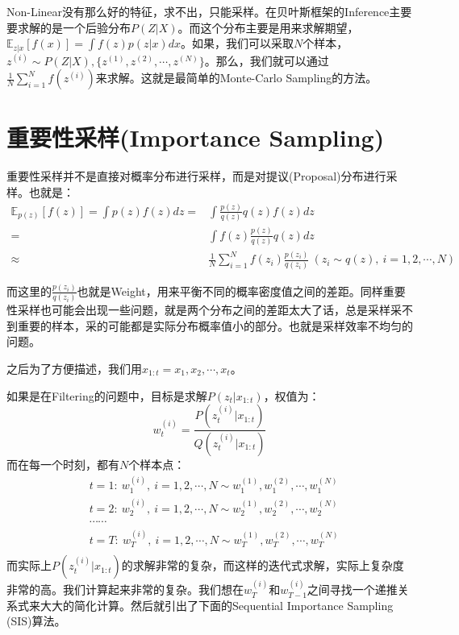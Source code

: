 \documentclass[a4paper]{article}
\begin{document}
Non-Linear没有那么好的特征，求不出，只能采样。在贝叶斯框架的Inference主要要求解的是一个后验分布$P(Z|X)$。而这个分布主要是用来求解期望，$\mathbb{E}_{z|x}[f(x)] = \int f(z)p(z|x)dx$。如果，我们可以采取$N$个样本，$z^{(i)}\sim P(Z|X),\{ z^{(1)},z^{(2)},\cdots,z^{(N)} \}$。那么，我们就可以通过$\frac{1}{N}\sum_{i=1}^N f(z^{(i)})$来求解。这就是最简单的Monte-Carlo Sampling的方法。

\section{重要性采样(Importance Sampling)}
重要性采样并不是直接对概率分布进行采样，而是对提议(Proposal)分布进行采样。也就是：
\begin{equation}
    \begin{split}
        \mathbb{E}_{p(z)}[f(z)] = \int p(z)f(z)dz 
        = & \int \frac{p(z)}{q(z)} q(z)f(z)dz \\
        = & \int f(z)\frac{p(z)}{q(z)} q(z)dz \\
        \approx & \frac{1}{N} \sum_{i=1}^N f(z_i) \frac{p(z_i)}{q(z_i)}\ (z_i \sim q(z),\ i = 1,2,\cdots,N)
    \end{split}
\end{equation}

而这里的$\frac{p(z_i)}{q(z_i)}$也就是Weight，用来平衡不同的概率密度值之间的差距。同样重要性采样也可能会出现一些问题，就是两个分布之间的差距太大了话，总是采样采不到重要的样本，采的可能都是实际分布概率值小的部分。也就是采样效率不均匀的问题。

{\color{red} 之后为了方便描述，我们用$x_{1:t} = x_1,x_2,\cdots,x_t$。}

如果是在Filtering的问题中，目标是求解$P(z_t|x_{1:t})$，权值为：
\begin{equation}
    w^{(i)}_t = \frac{P(z_t^{(i)}|x_{1:t})}{Q(z_t^{(i)}|x_{1:t})}
\end{equation}
而在每一个时刻，都有$N$个样本点：
\begin{equation}
    \begin{split}
        & t=1:\ w^{(i)}_1,\ i=1,2,\cdots,N \sim w^{(1)}_1,w^{(2)}_1,\cdots,w^{(N)}_1 \\
        & t=2:\ w^{(i)}_2,\ i=1,2,\cdots,N \sim w^{(1)}_2,w^{(2)}_2,\cdots,w^{(N)}_2 \\
        & \cdots\cdots \\
        & t=T:\ w^{(i)}_T,\ i=1,2,\cdots,N \sim w^{(1)}_T,w^{(2)}_T,\cdots,w^{(N)}_T \\
    \end{split}
\end{equation}
而实际上$P(z_t^{(i)}|x_{1:t})$的求解非常的复杂，而这样的迭代式求解，实际上复杂度非常的高。我们计算起来非常的复杂。我们想在$w^{(i)}_T$和$w^{(i)}_{T-1}$之间寻找一个递推关系式来大大的简化计算。然后就引出了下面的Sequential Importance Sampling (SIS)算法。
\end{document}
